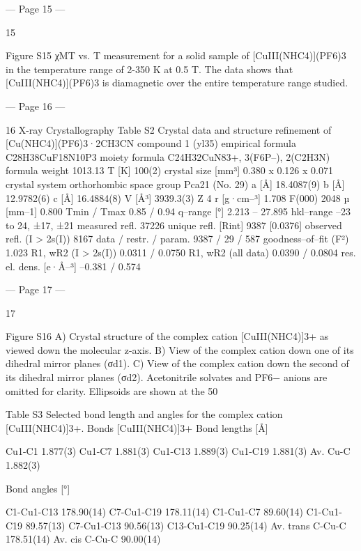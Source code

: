--- Page 15 ---
 
15 
 
Figure S15 χMT vs. T measurement for a solid sample of [CuIII(NHC4)](PF6)3  in the temperature range of 2-350 
K at 0.5 T. The data shows that [CuIII(NHC4)](PF6)3  is diamagnetic over the entire temperature range studied. 
 
 


--- Page 16 ---
 
16 
X-ray Crystallography 
Table S2 Crystal data and structure refinement of [Cu(NHC4)](PF6)3·2CH3CN 
compound 
1 (yl35) 
empirical formula 
C28H38CuF18N10P3 
moiety formula 
C24H32CuN83+, 3(F6P–), 2(C2H3N) 
formula weight 
1013.13 
T [K] 
100(2) 
crystal size [mm³] 
0.380 x 0.126 x 0.071 
crystal system 
orthorhombic 
space group 
Pca21 (No. 29) 
a [Å] 
18.4087(9) 
b [Å] 
12.9782(6) 
c [Å] 
16.4884(8) 
V [Å³] 
3939.3(3) 
Z 
4 
r [g·cm–³] 
1.708 
F(000) 
2048 
µ [mm–1] 
0.800 
Tmin / Tmax 
0.85 / 0.94 
q–range [°] 
2.213 – 27.895 
hkl–range 
–23 to 24, ±17, ±21 
measured refl. 
37226 
unique refl. [Rint] 
9387 [0.0376] 
observed refl. (I > 2s(I)) 
8167 
data / restr. / param. 
9387 / 29 / 587 
goodness–of–fit (F²) 
1.023 
R1, wR2 (I > 2s(I)) 
0.0311 / 0.0750 
R1, wR2 (all data) 
0.0390 / 0.0804 
res. el. dens. [e·Å–³] 
–0.381 / 0.574 
 


--- Page 17 ---
 
17 
 
Figure S16 A) Crystal structure of the complex cation [CuIII(NHC4)]3+ as viewed down the molecular z-axis. B)  
View of the complex cation down one of its dihedral mirror planes (σd1). C) View of the complex cation down the 
second of its dihedral mirror planes (σd2). Acetonitrile solvates and PF6− anions are omitted for clarity. Ellipsoids 
are shown at the 50%
 
 
Table S3 Selected bond length and angles for the complex cation [CuIII(NHC4)]3+. 
Bonds 
[CuIII(NHC4)]3+ 
Bond lengths [Å] 
 
Cu1-C1 
1.877(3) 
Cu1-C7 
1.881(3) 
Cu1-C13 
1.889(3) 
Cu1-C19 
1.881(3) 
Av. Cu-C 
1.882(3) 
 
 
Bond angles [°] 
 
C1-Cu1-C13 
178.90(14) 
C7-Cu1-C19 
178.11(14) 
C1-Cu1-C7 
89.60(14) 
C1-Cu1-C19 
89.57(13) 
C7-Cu1-C13 
90.56(13) 
C13-Cu1-C19 
90.25(14) 
Av. trans C-Cu-C 
178.51(14) 
Av. cis C-Cu-C 
90.00(14) 
 



